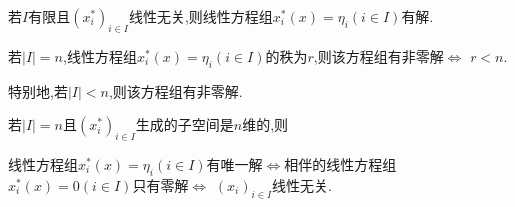 \begin{corollary}{}{}
	若$I$有限且$\left(x_{i}^{\ast}\right)_{i\in I}$线性无关,则线性方程组$x_{i}^{\ast}\left(x\right)=\eta_{i}\left(i\in I\right)$有解.
\end{corollary}

\begin{corollary}{}{}
	若$\left|I\right|=n$,线性方程组$x_{i}^{\ast}\left(x\right)=\eta_{i}\left(i\in I\right)$的秩为$r$,则该方程组有非零解$\iff$ $r<n$.
\end{corollary}

\begin{remark}{}{}
	特别地,若$\left|I\right|<n$,则该方程组有非零解.
\end{remark}

\begin{corollary}{}{}
	若$\left|I\right|=n$且$\left(x_{i}^{\ast}\right)_{i\in I}$生成的子空间是$n$维的,则
	\begin{center}
		线性方程组$x_{i}^{\ast}\left(x\right)=\eta_{i}\left(i\in I\right)$有唯一解$\iff$相伴的线性方程组$x_{i}^{\ast}\left(x\right)=0\left(i\in I\right)$只有零解$\iff$ $\left(x_{i}\right)_{i\in I}$线性无关.
	\end{center}
\end{corollary}